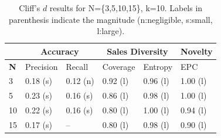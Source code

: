 \begin{table}[h!]
	\footnotesize
	\caption{Cliff's $d$ results for N=\{3,5,10,15\}, k=10. Labels in parenthesis indicate the magnitude (n:negligible, s:small, l:large).}
	\centering
	\begin{tabular}{|p{0.8cm}||p{1.2cm}|p{1.2cm}||p{1.2cm}|p{1.2cm}||p{1.2cm}|} \hline	
		& \multicolumn{2}{c||}{\textbf{Accuracy}} &  \multicolumn{2}{c||}{\textbf{Sales Diversity}}   & \textbf{Novelty}  \\ \hline
		\textbf{N} & Precision & Recall  & Coverage & Entropy & EPC  \\ \hline
		3          &  0.18 (s) & 0.12 (n)& 0.92 (l)& 0.96 (l)& 1.00 (l) \\ \hline
		5          &  0.23 (s) & 0.16 (s)& 0.86 (l)&  0.98 (l)& 1.00 (l) \\ \hline
		10         &  0.22 (s) & 0.16 (s)& 0.80 (l)&  1.00 (l)& 0.94 (l) \\ \hline
		15         &  0.17 (s) & -- & 0.80 (l)&  0.98 (l) & 0.90 (l)\\ \hline
	\end{tabular}
	\label{tab:Cliff}
\end{table}



